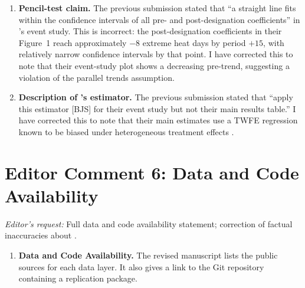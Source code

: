 \documentclass[12pt]{article}
\begin{document}
\begin{enumerate}[nosep]

\item \textbf{Pencil-test claim.}  The previous submission stated that
``a straight line fits within the confidence intervals of all pre- and
post-designation coefficients'' in \citeauthor{Ma2026}'s event study.
This is incorrect: the post-designation coefficients in their Figure~1
reach approximately $-8$ extreme heat days by period $+15$, with
relatively narrow confidence intervals by that point.  I have corrected this to note that
their event-study plot shows a decreasing pre-trend, suggesting a
violation of the parallel trends assumption.

\item \textbf{Description of \citeauthor{Ma2026}'s estimator.}  The
previous submission stated that \citeauthor{Ma2026} ``apply this
estimator [BJS] for their event study but not their main results table.''
I have corrected this to note that their main estimates use a TWFE
regression known to be biased under heterogeneous treatment
effects \citep{GoodmanBacon2021}.

\end{enumerate}

\section*{Editor Comment 6: Data and Code Availability}

\noindent\textit{Editor's request:} Full data and code availability
statement; correction of factual inaccuracies about \citet{Ma2026}.

\begin{enumerate}[nosep]
\item \textbf{Data and Code Availability.}  The revised manuscript lists the public sources for each data layer. It also gives a link to the Git repository containing a replication package.
\end{enumerate}


\end{document}
